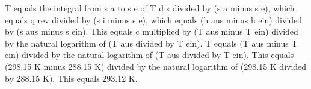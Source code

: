 T equals the integral from s a to s e of T d s divided by (s a minus s e), which equals q rev divided by (s i minus s e), which equals (h aus minus h ein) divided by (s aus minus s ein).  
This equals c multiplied by (T aus minus T ein) divided by the natural logarithm of (T aus divided by T ein).  
T equals (T aus minus T ein) divided by the natural logarithm of (T aus divided by T ein).  
This equals (298.15 K minus 288.15 K) divided by the natural logarithm of (298.15 K divided by 288.15 K).  
This equals 293.12 K.